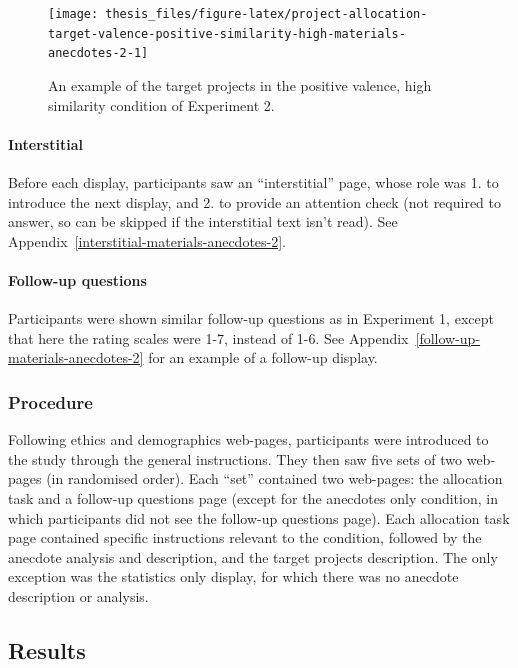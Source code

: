 \documentclass[a4paper, nobind, dvipsnames]{templates/ociamthesis}
\theoremstyle{definition}
\theoremstyle{definition}
\theoremstyle{definition}
\theoremstyle{definition}
\theoremstyle{remark}
\begin{document}
\begin{figure}
\texttt{[image: thesis\_files/figure-latex/project-allocation-target-valence-positive-similarity-high-materials-anecdotes-2-1]} \caption{An example of the target projects in the positive valence, high similarity condition of Experiment 2.}\label{fig:project-allocation-target-valence-positive-similarity-high-materials-anecdotes-2}
\end{figure}

\paragraph{Interstitial}

Before each display, participants saw an ``interstitial'' page, whose role was 1.
to introduce the next display, and 2. to provide an attention check (not
required to answer, so can be skipped if the interstitial text isn't read). See
Appendix~\ref{interstitial-materials-anecdotes-2}.

\paragraph{Follow-up questions}

Participants were shown similar follow-up questions as in Experiment 1, except
that here the rating scales were 1-7, instead of 1-6. See
Appendix~\ref{follow-up-materials-anecdotes-2} for an example of a follow-up
display.

\subsubsection{Procedure}

Following ethics and demographics web-pages, participants were introduced to the
study through the general instructions. They then saw five sets of two web-pages
(in randomised order). Each ``set'' contained two web-pages: the allocation task
and a follow-up questions page (except for the anecdotes only condition, in
which participants did not see the follow-up questions page). Each allocation
task page contained specific instructions relevant to the condition, followed by
the anecdote analysis and description, and the target projects description. The
only exception was the statistics only display, for which there was no anecdote
description or analysis.

\subsection{Results}
\end{document}
